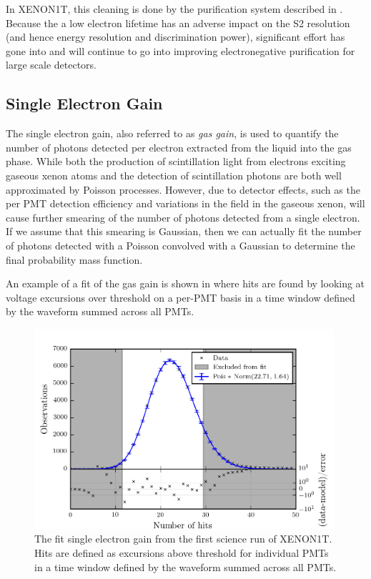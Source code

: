 In XENON1T, this cleaning is done by the purification system described in .  Because the a low electron lifetime has an adverse impact on the S2 resolution (and hence energy resolution and discrimination power), significant effort has gone into and will continue to go into improving electronegative purification for large scale detectors.  


\subsection{Single Electron Gain}
\label{sec:xe1t_gas_gain}

The single electron gain, also referred to as \textit{gas gain}, is used to quantify the number of photons detected per electron extracted from the liquid into the gas phase.  While both the production of scintillation light from electrons exciting gaseous xenon atoms and the detection of scintillation photons are both well approximated by Poisson processes.  However, due to detector effects, such as the per PMT detection efficiency and variations in the field in the gaseous xenon, will cause further smearing of the number of photons detected from a single electron.  If we assume that this smearing is Gaussian, then we can actually fit the number of photons detected with a Poisson convolved with a Gaussian to determine the final probability mass function.  

An example of a fit of the gas gain is shown in  where hits are found by looking at voltage excursions over threshold on a per-PMT basis in a time window defined by the waveform summed across all PMTs.

\begin{figure}[t]
	\centering
	\includegraphics[width=0.99\textwidth]{xe1t_single_electron_gain}
	\caption{The fit single electron gain from the first science run of XENON1T.  Hits are defined as excursions above threshold for individual PMTs in a time window defined by the waveform summed across all PMTs.}
	\label{fig:xe1t_single_electron_gain}
\end{figure}


